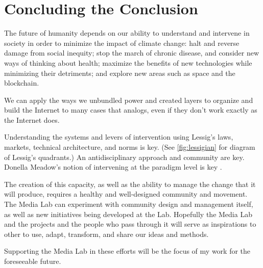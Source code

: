 \section{Concluding the Conclusion}

The future of humanity depends on our ability to understand and intervene in society in order to minimize the impact of climate change: halt and reverse damage from social inequity; stop the march of chronic disease, and consider new ways of thinking about health; maximize the benefits of new technologies while minimizing their detriments; and explore new areas such as space and the blockchain.

We can apply the ways we unbundled power and created layers to organize and build the Internet to many cases that analogs, even if they don't work exactly as the Internet does. 

Understanding the systems and levers of intervention using Lessig's laws, markets, technical architecture, and norms is key. (See \autoref{fig:lessigian} for diagram of Lessig's quadrants.) An antidisciplinary approach and community are key. Donella Meadow's notion of intervening at the paradigm level is key \cite{meadows_leverage}.

The creation of this capacity, as well as the ability to manage the change that it will produce, requires a healthy and well-designed community and movement. The Media Lab can experiment with community design and management itself, as well as new initiatives being developed at the Lab. Hopefully the Media Lab and the projects and the people who pass through it will serve as inspirations to other to use, adapt, transform, and share our ideas and methods.

Supporting the Media Lab in these efforts will be the focus of my work for the foreseeable future.